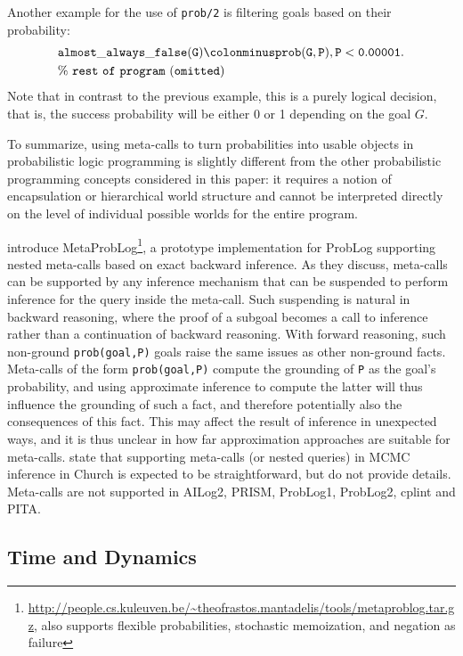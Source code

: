 \documentclass[a4paper]{article}
\begin{document}
Another example for the use of \verb|prob/2| is filtering goals based on their probability:
\begin{align*}
&\mathtt{almost\_always\_false(G)} \colonminus
\mathtt{prob(G,P), P < 0.00001}.\\
&\mathtt{\% ~rest~ of~ program ~(omitted)}
\end{align*}
Note that in contrast to the previous example, this is a purely logical decision, that is, the success probability will be either 0 or 1 depending on the goal $G$.



To summarize, using meta-calls to turn probabilities into usable
objects in probabilistic logic programming is slightly different from the other probabilistic programming concepts considered in this paper: it requires a notion of encapsulation or hierarchical world structure and cannot be interpreted directly on the level of individual possible worlds for the entire program. 

\citet{Mantadelis11}  introduce
MetaProbLog\footnote{\url{http://people.cs.kuleuven.be/~theofrastos.mantadelis/tools/metaproblog.tar.gz},
also supports flexible probabilities, stochastic memoization, and negation
as failure}, a prototype implementation for ProbLog supporting nested meta-calls based on
exact backward inference. As
they discuss, meta-calls
can be supported by any inference 
mechanism that can be suspended to perform inference for the query
inside the meta-call. Such suspending is natural in backward
reasoning, where the proof of a subgoal becomes a call to inference rather
than a continuation of backward reasoning. With forward reasoning,
such non-ground \verb|prob(goal,P)| goals raise the same issues as
other non-ground facts. 
Meta-calls of the form
\verb|prob(goal,P)| 
compute the grounding of \verb|P| as the goal's probability, and using
approximate inference to compute the latter will thus influence the grounding of
such a fact, and therefore potentially also the consequences of this
fact. This may affect the result of inference in unexpected ways, and
it is thus unclear in how far approximation approaches
are suitable for meta-calls.
\cite{Goodman08} state that supporting
meta-calls (or nested queries) in MCMC inference in Church is expected
to be straightforward, but do not provide details.  
Meta-calls are not
supported in AILog2, PRISM, ProbLog1, ProbLog2, cplint and PITA.



\subsection{Time and Dynamics}
\end{document}

